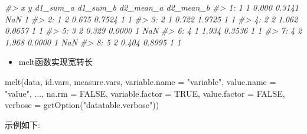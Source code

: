 \documentclass[
]{book}
\newenvironment{Shaded}{\begin{snugshade}}{\end{snugshade}}
\newcommand{\AttributeTok}[1]{\textcolor[rgb]{0.77,0.63,0.00}{#1}}
\newcommand{\CommentTok}[1]{\textcolor[rgb]{0.56,0.35,0.01}{\textit{#1}}}
\newcommand{\ConstantTok}[1]{\textcolor[rgb]{0.00,0.00,0.00}{#1}}
\newcommand{\FunctionTok}[1]{\textcolor[rgb]{0.00,0.00,0.00}{#1}}
\newcommand{\NormalTok}[1]{#1}
\newcommand{\StringTok}[1]{\textcolor[rgb]{0.31,0.60,0.02}{#1}}
\providecommand{\tightlist}{%
  \setlength{\itemsep}{0pt}\setlength{\parskip}{0pt}}
\begin{document}
\begin{Shaded}
\begin{Highlighting}[]
\CommentTok{\#\textgreater{}    x y d1\_sum\_a d1\_sum\_b d2\_mean\_a d2\_mean\_b}
\CommentTok{\#\textgreater{} 1: 1 1    0.000   0.3141       NaN         1}
\CommentTok{\#\textgreater{} 2: 1 2    0.675   0.7524         1         1}
\CommentTok{\#\textgreater{} 3: 2 1    0.722   1.9725         1         1}
\CommentTok{\#\textgreater{} 4: 2 2    1.062   0.0657         1         1}
\CommentTok{\#\textgreater{} 5: 3 2    0.329   0.0000         1       NaN}
\CommentTok{\#\textgreater{} 6: 4 1    1.934   0.3536         1         1}
\CommentTok{\#\textgreater{} 7: 4 2    1.968   0.0000         1       NaN}
\CommentTok{\#\textgreater{} 8: 5 2    0.404   0.8995         1         1}
\end{Highlighting}
\end{Shaded}

\begin{itemize}
\tightlist
\item
  melt函数实现宽转长
\end{itemize}

\begin{Shaded}
\begin{Highlighting}[]
\FunctionTok{melt}\NormalTok{(data, id.vars, measure.vars,}
    \AttributeTok{variable.name =} \StringTok{"variable"}\NormalTok{, }\AttributeTok{value.name =} \StringTok{"value"}\NormalTok{,}
\NormalTok{    ..., }\AttributeTok{na.rm =} \ConstantTok{FALSE}\NormalTok{, }\AttributeTok{variable.factor =} \ConstantTok{TRUE}\NormalTok{,}
    \AttributeTok{value.factor =} \ConstantTok{FALSE}\NormalTok{,}
    \AttributeTok{verbose =} \FunctionTok{getOption}\NormalTok{(}\StringTok{"datatable.verbose"}\NormalTok{))}
\end{Highlighting}
\end{Shaded}

示例如下:
\end{document}

